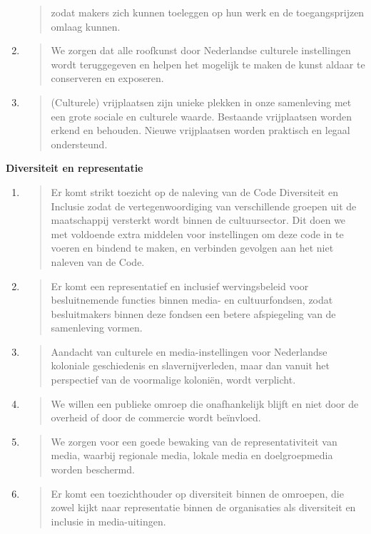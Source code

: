 \begin{enumerate}
\begin{quote}
  zodat makers zich kunnen toeleggen op hun werk en de toegangsprijzen
  omlaag kunnen.
  \end{quote}
\item
  \begin{quote}
  We zorgen dat alle roofkunst door Nederlandse culturele instellingen
  wordt teruggegeven en helpen het mogelijk te maken de kunst aldaar te
  conserveren en exposeren.
  \end{quote}
\item
  \begin{quote}
  (Culturele) vrijplaatsen zijn unieke plekken in onze samenleving met
  een grote sociale en culturele waarde. Bestaande vrijplaatsen worden
  erkend en behouden. Nieuwe vrijplaatsen worden praktisch en legaal
  ondersteund.
  \end{quote}
\end{enumerate}

\textbf{Diversiteit en representatie}

\begin{enumerate}
\def\labelenumi{\arabic{enumi}.}
\item
  \begin{quote}
  Er komt strikt toezicht op de naleving van de Code Diversiteit en
  Inclusie zodat de vertegenwoordiging van verschillende groepen uit de
  maatschappij versterkt wordt binnen de cultuursector. Dit doen we met
  voldoende extra middelen voor instellingen om deze code in te voeren
  en bindend te maken, en verbinden gevolgen aan het niet naleven van de
  Code.
  \end{quote}
\item
  \begin{quote}
  Er komt een representatief en inclusief wervingsbeleid voor
  besluitnemende functies binnen media- en cultuurfondsen, zodat
  besluitmakers binnen deze fondsen een betere afspiegeling van de
  samenleving vormen.
  \end{quote}
\item
  \begin{quote}
  Aandacht van culturele en media-instellingen voor Nederlandse
  koloniale geschiedenis en slavernijverleden, maar dan vanuit het
  perspectief van de voormalige koloniën, wordt verplicht.
  \end{quote}
\item
  \begin{quote}
  We willen een publieke omroep die onafhankelijk blijft en niet door de
  overheid of door de commercie wordt beïnvloed.
  \end{quote}
\item
  \begin{quote}
  We zorgen voor een goede bewaking van de representativiteit van media,
  waarbij regionale media, lokale media en doelgroepmedia worden
  beschermd.
  \end{quote}
\item
  \begin{quote}
  Er komt een toezichthouder op diversiteit binnen de omroepen, die
  zowel kijkt naar representatie binnen de organisaties als diversiteit
  en inclusie in media-uitingen.
  \end{quote}
\end{enumerate}

